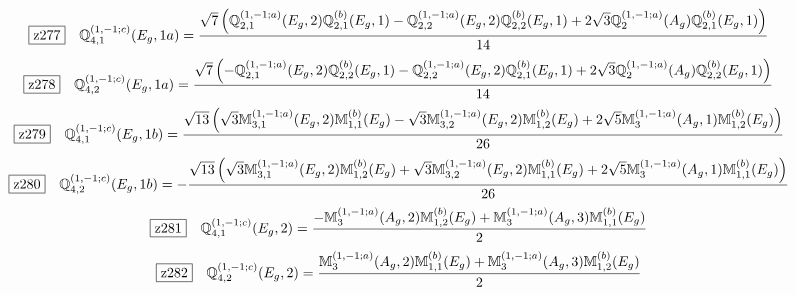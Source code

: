 \documentclass[fleqn,10pt,landscape]{jsarticle}
\begin{document}
\begin{dmath*}
\hspace*{3mm}\fbox{z277}\quad \mathbb{Q}_{4,1}^{(1,-1;c)}(E_{g},1a)=\frac{\sqrt{7} \left(\mathbb{Q}_{2,1}^{(1,-1;a)}(E_{g},2) \mathbb{Q}_{2,1}^{(b)}(E_{g},1) - \mathbb{Q}_{2,2}^{(1,-1;a)}(E_{g},2) \mathbb{Q}_{2,2}^{(b)}(E_{g},1) + 2 \sqrt{3} \mathbb{Q}_{2}^{(1,-1;a)}(A_{g}) \mathbb{Q}_{2,1}^{(b)}(E_{g},1)\right)}{14}
\end{dmath*}
\begin{dmath*}
\hspace*{3mm}\fbox{z278}\quad \mathbb{Q}_{4,2}^{(1,-1;c)}(E_{g},1a)=\frac{\sqrt{7} \left(- \mathbb{Q}_{2,1}^{(1,-1;a)}(E_{g},2) \mathbb{Q}_{2,2}^{(b)}(E_{g},1) - \mathbb{Q}_{2,2}^{(1,-1;a)}(E_{g},2) \mathbb{Q}_{2,1}^{(b)}(E_{g},1) + 2 \sqrt{3} \mathbb{Q}_{2}^{(1,-1;a)}(A_{g}) \mathbb{Q}_{2,2}^{(b)}(E_{g},1)\right)}{14}
\end{dmath*}
\begin{dmath*}
\hspace*{3mm}\fbox{z279}\quad \mathbb{Q}_{4,1}^{(1,-1;c)}(E_{g},1b)=\frac{\sqrt{13} \left(\sqrt{3} \mathbb{M}_{3,1}^{(1,-1;a)}(E_{g},2) \mathbb{M}_{1,1}^{(b)}(E_{g}) - \sqrt{3} \mathbb{M}_{3,2}^{(1,-1;a)}(E_{g},2) \mathbb{M}_{1,2}^{(b)}(E_{g}) + 2 \sqrt{5} \mathbb{M}_{3}^{(1,-1;a)}(A_{g},1) \mathbb{M}_{1,2}^{(b)}(E_{g})\right)}{26}
\end{dmath*}
\begin{dmath*}
\hspace*{3mm}\fbox{z280}\quad \mathbb{Q}_{4,2}^{(1,-1;c)}(E_{g},1b)=- \frac{\sqrt{13} \left(\sqrt{3} \mathbb{M}_{3,1}^{(1,-1;a)}(E_{g},2) \mathbb{M}_{1,2}^{(b)}(E_{g}) + \sqrt{3} \mathbb{M}_{3,2}^{(1,-1;a)}(E_{g},2) \mathbb{M}_{1,1}^{(b)}(E_{g}) + 2 \sqrt{5} \mathbb{M}_{3}^{(1,-1;a)}(A_{g},1) \mathbb{M}_{1,1}^{(b)}(E_{g})\right)}{26}
\end{dmath*}
\begin{dmath*}
\hspace*{3mm}\fbox{z281}\quad \mathbb{Q}_{4,1}^{(1,-1;c)}(E_{g},2)=\frac{- \mathbb{M}_{3}^{(1,-1;a)}(A_{g},2) \mathbb{M}_{1,2}^{(b)}(E_{g}) + \mathbb{M}_{3}^{(1,-1;a)}(A_{g},3) \mathbb{M}_{1,1}^{(b)}(E_{g})}{2}
\end{dmath*}
\begin{dmath*}
\hspace*{3mm}\fbox{z282}\quad \mathbb{Q}_{4,2}^{(1,-1;c)}(E_{g},2)=\frac{\mathbb{M}_{3}^{(1,-1;a)}(A_{g},2) \mathbb{M}_{1,1}^{(b)}(E_{g}) + \mathbb{M}_{3}^{(1,-1;a)}(A_{g},3) \mathbb{M}_{1,2}^{(b)}(E_{g})}{2}
\end{dmath*}
\end{document}
